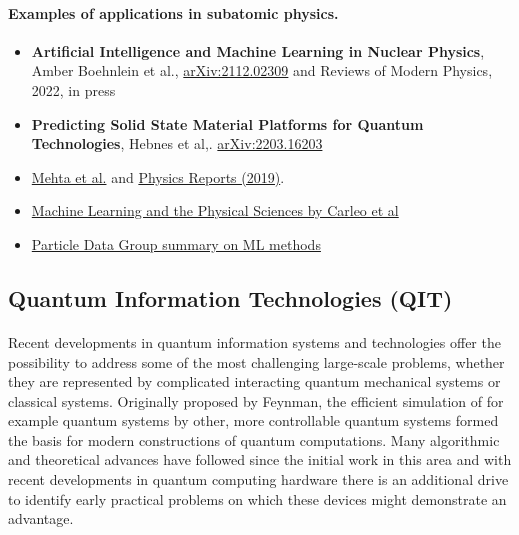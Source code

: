 \documentclass[%
oneside,                 %
final,                   %
10pt]{article}
\begin{document}
\paragraph{Examples of applications in subatomic physics.}
\begin{itemize}
\item \textbf{Artificial Intelligence and Machine Learning in Nuclear Physics}, Amber Boehnlein et al., \href{{https://arxiv.org/abs/2112.02309}}{arXiv:2112.02309} and Reviews of Modern Physics, 2022, in press

\item \textbf{Predicting Solid State Material Platforms for Quantum Technologies}, Hebnes et al,. \href{{https://arxiv.org/abs/2203.16203}}{arXiv:2203.16203}

\item \href{{https://arxiv.org/abs/1803.08823}}{Mehta et al.} and \href{{https://www.sciencedirect.com/science/article/pii/S0370157319300766?via%

\item \href{{https://link.aps.org/doi/10.1103/RevModPhys.91.045002}}{Machine Learning and the Physical Sciences by Carleo et al}

\item \href{{https://pdg.lbl.gov/2021/reviews/rpp2021-rev-machine-learning.pdf}}{Particle Data Group summary on ML methods}
\end{itemize}

\noindent



\subsection{Quantum Information Technologies (QIT)}


\paragraph{}
Recent developments in quantum information systems
and technologies offer the possibility to address some of the most
challenging large-scale problems, whether they are represented by
complicated interacting quantum mechanical systems or classical
systems.  Originally proposed by Feynman, the efficient simulation of
for example quantum systems by other, more controllable quantum
systems formed the basis for modern constructions of quantum
computations.  Many algorithmic and theoretical advances have followed
since the initial work in this area and with recent developments in
quantum computing hardware there is an additional drive to identify
early practical problems on which these devices might demonstrate an
advantage.
\end{document}
